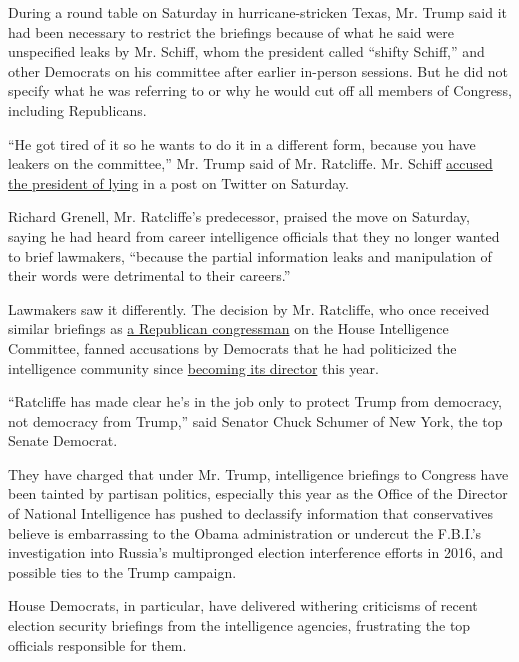 During a round table on Saturday in hurricane-stricken Texas, Mr. Trump
said it had been necessary to restrict the briefings because of what he
said were unspecified leaks by Mr. Schiff, whom the president called
``shifty Schiff,'' and other Democrats on his committee after earlier
in-person sessions. But he did not specify what he was referring to or
why he would cut off all members of Congress, including Republicans.

``He got tired of it so he wants to do it in a different form, because
you have leakers on the committee,'' Mr. Trump said of Mr. Ratcliffe.
Mr. Schiff
\href{https://twitter.com/repadamschiff/status/1299837041858031623?s=11}{accused
the president of lying} in a post on Twitter on Saturday.

Richard Grenell, Mr. Ratcliffe's predecessor, praised the move on
Saturday, saying he had heard from career intelligence officials that
they no longer wanted to brief lawmakers, ``because the partial
information leaks and manipulation of their words were detrimental to
their careers.''

Lawmakers saw it differently. The decision by Mr. Ratcliffe, who once
received similar briefings as
\href{https://www.nytimes3xbfgragh.onion/2020/02/28/us/politics/john-ratcliffe-director-national-intelligence.html}{a
Republican congressman} on the House Intelligence Committee, fanned
accusations by Democrats that he had politicized the intelligence
community since
\href{https://www.nytimes3xbfgragh.onion/2020/05/21/us/politics/john-ratcliffe-intelligence-director.html}{becoming
its director} this year.

``Ratcliffe has made clear he's in the job only to protect Trump from
democracy, not democracy from Trump,'' said Senator Chuck Schumer of New
York, the top Senate Democrat.

They have charged that under Mr. Trump, intelligence briefings to
Congress have been tainted by partisan politics, especially this year as
the Office of the Director of National Intelligence has pushed to
declassify information that conservatives believe is embarrassing to the
Obama administration or undercut the F.B.I.'s investigation into
Russia's multipronged election interference efforts in 2016, and
possible ties to the Trump campaign.

House Democrats, in particular, have delivered withering criticisms of
recent election security briefings from the intelligence agencies,
frustrating the top officials responsible for them.

